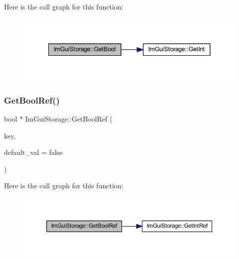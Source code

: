 Here is the call graph for this function\+:
\nopagebreak
\begin{figure}[H]
\begin{center}
\leavevmode
\includegraphics[width=341pt]{struct_im_gui_storage_a22d34ae6278f86468a3e7df8fbd1b632_cgraph}
\end{center}
\end{figure}
\mbox{\label{struct_im_gui_storage_aeb0d62100453d710bac5f6ad0a6e6a2e}} 
\subsubsection{\texorpdfstring{Get\+Bool\+Ref()}{GetBoolRef()}}
{\footnotesize\ttfamily bool $\ast$ Im\+Gui\+Storage\+::\+Get\+Bool\+Ref (\begin{DoxyParamCaption}\item[{\mbox{\hyperlink{imgui_8h_a1785c9b6f4e16406764a85f32582236f}{Im\+Gui\+ID}}}]{key,  }\item[{bool}]{default\+\_\+val = {\ttfamily false} }\end{DoxyParamCaption})}

Here is the call graph for this function\+:
\nopagebreak
\begin{figure}[H]
\begin{center}
\leavevmode
\includegraphics[width=350pt]{struct_im_gui_storage_aeb0d62100453d710bac5f6ad0a6e6a2e_cgraph}
\end{center}
\end{figure}
\mbox{\label{struct_im_gui_storage_a0f51ef327f7e548d003b0e006967c1eb}} 
